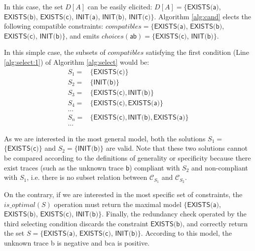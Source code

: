 In this case, the set $D[A]$ can be easily elicited: $D[A]=\{ \textsf{EXISTS(a)}$, $\textsf{EXISTS(b)}$, $\textsf{EXISTS(c)}$, $\textsf{INIT(a)}$, $\textsf{INIT(b)}$, $\textsf{INIT(c)} \}$. Algorithm \ref{alg:cand} elects the following compatible constraints: ${compatibles}=$$\{ \textsf{EXISTS(a)}$, $\textsf{EXISTS(b)}$, $\textsf{EXISTS(c)}$, $\textsf{INIT(b)}\}$, and emits ${choices}(\textsf{ab})=$$\{ \textsf{EXISTS(c)}$, $\textsf{INIT(b)}\}$.


In this simple case, the subsets of ${compatibles}$ satisfying the first condition (Line \ref{alg:select:1}) of Algorithm \ref{alg:select} would be: 
\[
\begin{array}{cl}
 S_1= &  \{\textsf{EXISTS(c)}\}  \\
 S_2= &  \{\textsf{INIT(b)}\}   \\
 S_3= &  \{\textsf{EXISTS(c)}, \textsf{INIT(b)}\} \\
 S_4= & \{\textsf{EXISTS(c)}, \textsf{EXISTS(a)}\} \\
  ... & \\
 S_n= & \{\textsf{EXISTS(c)}, \textsf{INIT(b)}, \textsf{EXISTS(a)}\} \\
 ... &
\end{array}
\]

As we are interested in the most general model, both the solutions $S_1=$ $\{\textsf{EXISTS(c)}\}$ and $S_2=$$\{\textsf{INIT(b)}\}$ are valid. Note that these two solutions cannot be compared according to the definitions of generality or specificity because there exist traces (such as the unknown trace $\textsf{b}$) compliant with $S_2$ and non-compliant with $S_1$, i.e. there is no subset relation between $\mathcal{C}_{S_1}$ and $\mathcal{C}_{S_2}$.

On the contrary, if we are interested in the most specific set of constraints, the ${is\_optimal}(S)$ operation must return the maximal model $\{\textsf{EXISTS(a)}$, $\textsf{EXISTS(b)}$, $\textsf{EXISTS(c)}$, $\textsf{INIT(b)}\}$. Finally, the redundancy check operated by the third selecting condition discards the constraint $\textsf{EXISTS(b)}$, and correctly return the set $S=$$\{\textsf{EXISTS(a)}$, $\textsf{EXISTS(c)}$, $\textsf{INIT(b)}\}$. According to this model, the unknown trace \textsf{b} is negative and \textsf{bca} is positive. 


